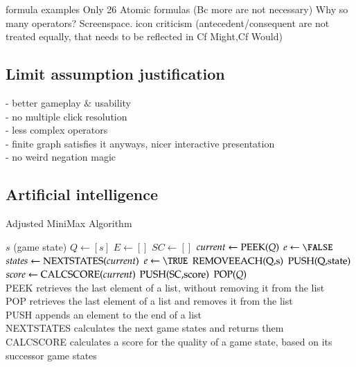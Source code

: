 \documentclass[a4paper,american,10pt]{paper}
\theoremstyle{definition}\newtheorem{definition}{Definition}
\begin{document}
formula examples
Only 26 Atomic formulas (Bc more are not necessary)
Why so many operators? Screenspace.
icon criticism (antecedent/consequent are not treated equally, that needs to be reflected in Cf Might,Cf Would)
\subsection{Limit assumption justification}
- better gameplay $\&$ usability\\
- no multiple click resolution\\
- less complex operators\\
- finite graph satisfies it anyways, nicer interactive presentation\\
- no weird negation magic
\subsection{Artificial intelligence}
\begin{algorithm}[H]
\caption{Adjusted MiniMax Algorithm}\label{alg:minimax}
\begin{algorithmic}[1]
\Require $s$ (game state)
	\State $Q \gets [s]$
	\State $E \gets []$
	\State $SC \gets []$
		\State $current \gets \Call{PEEK}{Q}$
		\State $e \gets \FALSE$
		\State $states \gets \Call{NEXTSTATES}{current}$
			\State {}
			\State $e \gets \TRUE$
						\State $\Call{REMOVEEACH}{$Q$, $s$}$
					\EndIf
					\State $\Call{PUSH}{$Q$, $state$}$
				\EndIf
			\EndFor
		\EndIf
			\State $score \gets \Call{CALCSCORE}{current}$
			\State $\Call{PUSH}{$SC$, $score$}$
			\State $\Call{POP}{Q}$
		\EndIf
	\EndWhile
\EndFunction\\
PEEK retrieves the last element of a list, without removing it from the list\\
POP retrieves the last element of a list and removes it from the list\\
PUSH appends an element to the end of a list\\
NEXTSTATES calculates the next game states and returns them\\
CALCSCORE calculates a score for the quality of a game state, based on its successor game states
\end{algorithmic}
\end{algorithm}
\end{document}
